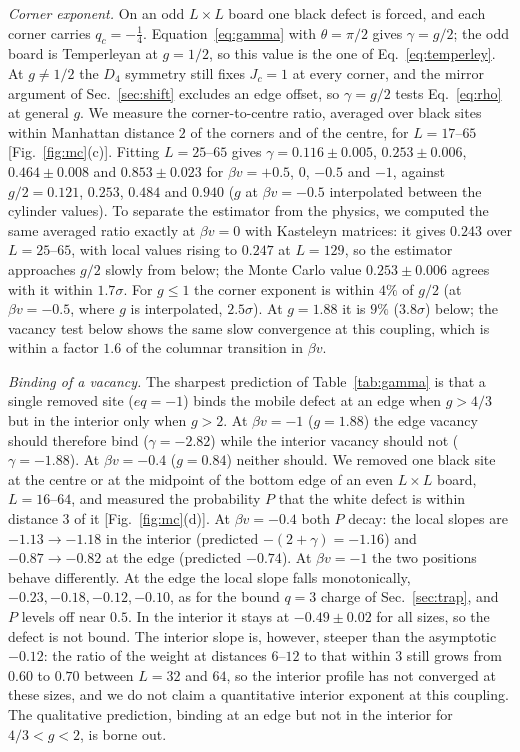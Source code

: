 \documentclass[aps,pre,twocolumn,superscriptaddress,nofootinbib,floatfix]{revtex4-2}
\begin{document}
\emph{Corner exponent.} On an odd $L\times L$ board one black defect is forced, and each corner carries $q_c=-\tfrac14$. Equation~\eqref{eq:gamma} with $\theta=\pi/2$ gives $\gamma=g/2$; the odd board is Temperleyan at $g=1/2$, so this value is the one of Eq.~\eqref{eq:temperley}. At $g\ne1/2$ the $D_4$ symmetry still fixes $J_c=1$ at every corner, and the mirror argument of Sec.~\ref{sec:shift} excludes an edge offset, so $\gamma=g/2$ tests Eq.~\eqref{eq:rho} at general $g$. We measure the corner-to-centre ratio, averaged over black sites within Manhattan distance $2$ of the corners and of the centre, for $L=17$--$65$ [Fig.~\ref{fig:mc}(c)]. Fitting $L=25$--$65$ gives $\gamma=0.116\pm0.005$, $0.253\pm0.006$, $0.464\pm0.008$ and $0.853\pm0.023$ for $\beta v=+0.5$, $0$, $-0.5$ and $-1$, against $g/2=0.121$, $0.253$, $0.484$ and $0.940$ ($g$ at $\beta v=-0.5$ interpolated between the cylinder values). To separate the estimator from the physics, we computed the same averaged ratio exactly at $\beta v=0$ with Kasteleyn matrices: it gives $0.243$ over $L=25$--$65$, with local values rising to $0.247$ at $L=129$, so the estimator approaches $g/2$ slowly from below; the Monte Carlo value $0.253\pm0.006$ agrees with it within $1.7\sigma$. For $g\le1$ the corner exponent is within $4\%$ of $g/2$ (at $\beta v=-0.5$, where $g$ is interpolated, $2.5\sigma$). At $g=1.88$ it is $9\%$ ($3.8\sigma$) below; the vacancy test below shows the same slow convergence at this coupling, which is within a factor $1.6$ of the columnar transition in $\beta v$.

\emph{Binding of a vacancy.} The sharpest prediction of Table~\ref{tab:gamma} is that a single removed site ($eq=-1$) binds the mobile defect at an edge when $g>4/3$ but in the interior only when $g>2$. At $\beta v=-1$ ($g=1.88$) the edge vacancy should therefore bind ($\gamma=-2.82$) while the interior vacancy should not ($\gamma=-1.88$). At $\beta v=-0.4$ ($g=0.84$) neither should. We removed one black site at the centre or at the midpoint of the bottom edge of an even $L\times L$ board, $L=16$--$64$, and measured the probability $P$ that the white defect is within distance $3$ of it [Fig.~\ref{fig:mc}(d)]. At $\beta v=-0.4$ both $P$ decay: the local slopes are $-1.13\to-1.18$ in the interior (predicted $-(2+\gamma)=-1.16$) and $-0.87\to-0.82$ at the edge (predicted $-0.74$). At $\beta v=-1$ the two positions behave differently. At the edge the local slope falls monotonically, $-0.23,-0.18,-0.12,-0.10$, as for the bound $q=3$ charge of Sec.~\ref{sec:trap}, and $P$ levels off near $0.5$. In the interior it stays at $-0.49\pm0.02$ for all sizes, so the defect is not bound. The interior slope is, however, steeper than the asymptotic $-0.12$: the ratio of the weight at distances $6$--$12$ to that within $3$ still grows from $0.60$ to $0.70$ between $L=32$ and $64$, so the interior profile has not converged at these sizes, and we do not claim a quantitative interior exponent at this coupling. The qualitative prediction, binding at an edge but not in the interior for $4/3<g<2$, is borne out.
\end{document}
